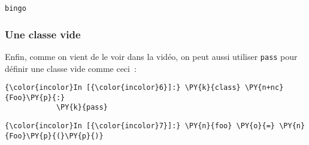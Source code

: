     \begin{Verbatim}[commandchars=\\\{\},frame=single,framerule=0.3mm,rulecolor=\color{cellframecolor}]
bingo
\end{Verbatim}

    \hypertarget{une-classe-vide}{%
\subsubsection{Une classe vide}\label{une-classe-vide}}

    Enfin, comme on vient de le voir dans la vidéo, on peut aussi utiliser
\texttt{pass} pour définir une classe vide comme ceci~:

    \begin{Verbatim}[commandchars=\\\{\},frame=single,framerule=0.3mm,rulecolor=\color{cellframecolor}]
{\color{incolor}In [{\color{incolor}6}]:} \PY{k}{class} \PY{n+nc}{Foo}\PY{p}{:}
            \PY{k}{pass}
\end{Verbatim}


    \begin{Verbatim}[commandchars=\\\{\},frame=single,framerule=0.3mm,rulecolor=\color{cellframecolor}]
{\color{incolor}In [{\color{incolor}7}]:} \PY{n}{foo} \PY{o}{=} \PY{n}{Foo}\PY{p}{(}\PY{p}{)}
\end{Verbatim}



    
    
    
